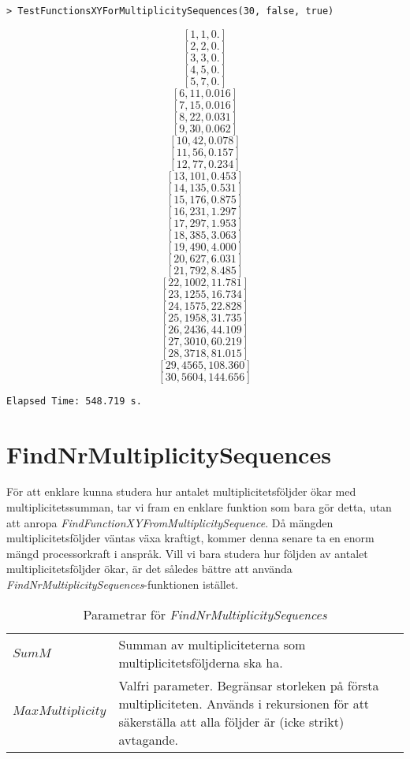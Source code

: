 \begin{verbatim}
> TestFunctionsXYForMultiplicitySequences(30, false, true)
\end{verbatim}
\[[1, 1, 0.]\]
\[[2, 2, 0.]\]
\[[3, 3, 0.]\]
\[[4, 5, 0.]\]
\[[5, 7, 0.]\]
\[[6, 11, 0.016]\]
\[[7, 15, 0.016]\]
\[[8, 22, 0.031]\]
\[[9, 30, 0.062]\]
\[[10, 42, 0.078]\]
\[[11, 56, 0.157]\]
\[[12, 77, 0.234]\]
\[[13, 101, 0.453]\]
\[[14, 135, 0.531]\]
\[[15, 176, 0.875]\]
\[[16, 231, 1.297]\]
\[[17, 297, 1.953]\]
\[[18, 385, 3.063]\]
\[[19, 490, 4.000]\]
\[[20, 627, 6.031]\]
\[[21, 792, 8.485]\]
\[[22, 1002, 11.781]\]
\[[23, 1255, 16.734]\]
\[[24, 1575, 22.828]\]
\[[25, 1958, 31.735]\]
\[[26, 2436, 44.109]\]
\[[27, 3010, 60.219]\]
\[[28, 3718, 81.015]\]
\[[29, 4565, 108.360]\]
\[[30, 5604, 144.656]\]
\begin{verbatim}
Elapsed Time: 548.719 s.
\end{verbatim}

\section{FindNrMultiplicitySequences}
\label{FindNrMultiplicitySequences}

För att enklare kunna studera hur antalet multiplicitetsföljder ökar med multiplicitetssumman, tar vi fram en enklare funktion som bara gör detta, utan att anropa \emph{FindFunctionXYFromMultiplicitySequence}. Då mängden multiplicitetsföljder väntas växa kraftigt, kommer denna senare ta en enorm mängd processorkraft i anspråk. Vill vi bara studera hur följden av antalet multiplicitetsföljder ökar, är det således bättre att använda \emph{FindNrMultiplicitySequences}-funktionen istället.

\begin{table}[h]
\caption{Parametrar för \emph{FindNrMultiplicitySequences}}
\begin{center}
\begin{tabular}{|l|p{9cm}|}
\hline
$SumM$ & Summan av multipliciteterna som multiplicitetsföljderna ska ha.\\
$MaxMultiplicity$ & Valfri parameter. Begränsar storleken på första multipliciteten. Används i rekursionen för att säkerställa att alla följder är (icke strikt) avtagande.\\
\hline
\end{tabular}
\end{center}
\end{table}

